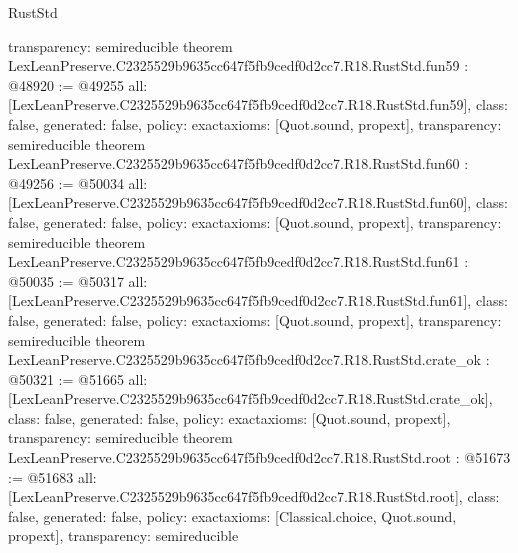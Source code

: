 \begin{lexlean}{RustStd}
\begin{coremodule}
{  transparency: semireducible
}
theorem LexLeanPreserve.C2325529b9635cc647f5fb9cedf0d2cc7.R18.RustStd.fun59 : @48920 := @49255 {
  all: [LexLeanPreserve.C2325529b9635cc647f5fb9cedf0d2cc7.R18.RustStd.fun59],
  class: false,
  generated: false,
  policy: exact{axioms: [Quot.sound, propext]},
  transparency: semireducible
}
theorem LexLeanPreserve.C2325529b9635cc647f5fb9cedf0d2cc7.R18.RustStd.fun60 : @49256 := @50034 {
  all: [LexLeanPreserve.C2325529b9635cc647f5fb9cedf0d2cc7.R18.RustStd.fun60],
  class: false,
  generated: false,
  policy: exact{axioms: [Quot.sound, propext]},
  transparency: semireducible
}
theorem LexLeanPreserve.C2325529b9635cc647f5fb9cedf0d2cc7.R18.RustStd.fun61 : @50035 := @50317 {
  all: [LexLeanPreserve.C2325529b9635cc647f5fb9cedf0d2cc7.R18.RustStd.fun61],
  class: false,
  generated: false,
  policy: exact{axioms: [Quot.sound, propext]},
  transparency: semireducible
}
theorem LexLeanPreserve.C2325529b9635cc647f5fb9cedf0d2cc7.R18.RustStd.crate_ok : @50321 := @51665 {
  all: [LexLeanPreserve.C2325529b9635cc647f5fb9cedf0d2cc7.R18.RustStd.crate_ok],
  class: false,
  generated: false,
  policy: exact{axioms: [Quot.sound, propext]},
  transparency: semireducible
}
theorem LexLeanPreserve.C2325529b9635cc647f5fb9cedf0d2cc7.R18.RustStd.root : @51673 := @51683 {
  all: [LexLeanPreserve.C2325529b9635cc647f5fb9cedf0d2cc7.R18.RustStd.root],
  class: false,
  generated: false,
  policy: exact{axioms: [Classical.choice, Quot.sound, propext]},
  transparency: semireducible
}


\end{coremodule}
\end{lexlean}
